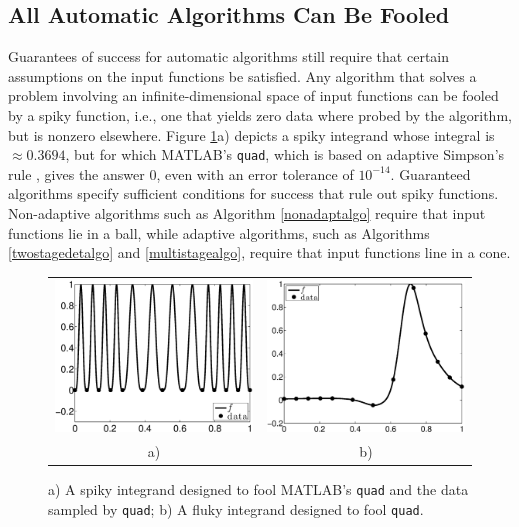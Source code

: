 \documentclass[]{elsarticle}
\theoremstyle{definition}
\theoremstyle{remark}
\begin{document}
\subsection{All Automatic Algorithms Can Be Fooled}  

Guarantees of success for automatic algorithms still require that certain assumptions on the input functions be satisfied.  Any algorithm that solves a problem involving an infinite-dimensional space of input functions can be fooled by a spiky function, i.e., one that yields zero data where probed by the algorithm, but is nonzero elsewhere.   Figure \ref{fig:foolquad}a) depicts a spiky integrand whose integral is $\approx 0.3694$, but for which MATLAB's {\tt quad}, which is based on adaptive Simpson's rule  \cite{GanGau00a}, gives the answer $0$, even with an error tolerance of $10^{-14}$.  Guaranteed algorithms specify sufficient conditions for success that rule out spiky functions.  Non-adaptive algorithms such as Algorithm \ref{nonadaptalgo} require that input functions lie in a ball, while adaptive algorithms, such as  Algorithms \ref{twostagedetalgo} and \ref{multistagealgo}, require that input functions line in a cone.

\begin{figure}
\centering 
\begin{tabular}{cc}
\includegraphics[width=5.5cm]{Foolquadbw.eps}
&
\includegraphics[width=5.5cm]{foolbwquadexample.eps} \\
a) & b)
\end{tabular}
\caption{a) A spiky integrand designed to fool MATLAB's {\tt quad} and the data sampled by {\tt quad}; b) A fluky integrand designed to fool {\tt quad}. \label{fig:foolquad}}
\end{figure}
\end{document}
